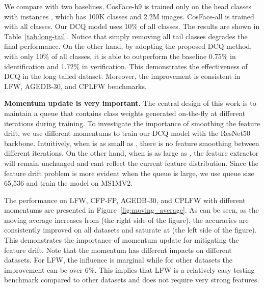 \documentclass[10pt,twocolumn,letterpaper]{article}
\begin{document}
\begin{table}[h]
   \centering
   \footnotesize
   \caption{\textbf{Comparison on training with long-tailed dataset: MF2} \label{tab:long-tail}}
\end{table}

We compare with two baselines, CosFace-h9 is trained only on the head classes with instances , which has 100K classes and 2.2M images. CosFace-all is trained with all classes. Our DCQ model uses 10\% of all classes. The results are shown in Table~\ref{tab:long-tail}. Notice that simply removing all tail classes degrades the final performance. On the other hand, by adopting the proposed DCQ method, with only 10\% of all classes, it is able to outperform the baseline 0.75\% in identification and 1.72\% in verification. This demonstrates the effectiveness of DCQ in the long-tailed dataset. Moreover, the improvement is consistent in LFW, AGEDB-30, and CPLFW benchmarks.

\textbf{Momentum update is very important.} The central design of this work is to maintain a queue that contains class weights generated on-the-fly at different iterations during training. To investigate the importance of smoothing the feature drift, we use different momentums  to train our DCQ model with the ResNet50 backbone. Intuitively, when  is as small as , there is no feature smoothing between different iterations. On the other hand, when  is as large as , the feature extractor will remain unchanged and cant reflect the current feature distribution. Since the feature drift problem is more evident when the queue is large, we use queue size 65,536 and train the model on MS1MV2. 

The performance on LFW, CFP-FP, AGEDB-30, and CPLFW with different momentums are presented in Figure~\ref{fig:moving_average}. As can be seen, as the moving average  increases from  (the right side of the figure), the accuracies are consistently improved on all datasets and saturate at  (the left side of the figure). This demonstrates the importance of momentum update for mitigating the feature drift. Note that the momentum has different impacts on different datasets. For LFW, the influence is marginal while for other datasets the improvement can be over 6\%. This implies that LFW is a relatively easy testing benchmark compared to other datasets and does not require very strong features.
\end{document}
